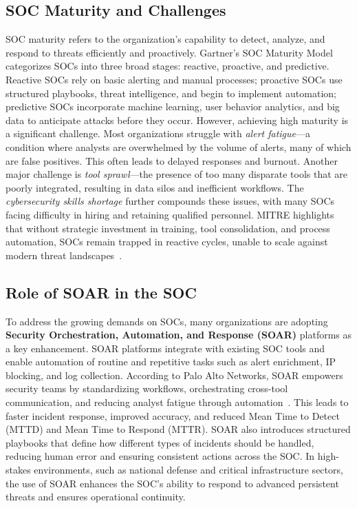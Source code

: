 \subsection{SOC Maturity and Challenges}

SOC maturity refers to the organization's capability to detect, analyze, and respond to threats efficiently and proactively. Gartner’s SOC Maturity Model categorizes SOCs into three broad stages: reactive, proactive, and predictive. Reactive SOCs rely on basic alerting and manual processes; proactive SOCs use structured playbooks, threat intelligence, and begin to implement automation; predictive SOCs incorporate machine learning, user behavior analytics, and big data to anticipate attacks before they occur. However, achieving high maturity is a significant challenge. Most organizations struggle with \textit{alert fatigue}—a condition where analysts are overwhelmed by the volume of alerts, many of which are false positives. This often leads to delayed responses and burnout. Another major challenge is \textit{tool sprawl}—the presence of too many disparate tools that are poorly integrated, resulting in data silos and inefficient workflows. The \textit{cybersecurity skills shortage} further compounds these issues, with many SOCs facing difficulty in hiring and retaining qualified personnel. MITRE highlights that without strategic investment in training, tool consolidation, and process automation, SOCs remain trapped in reactive cycles, unable to scale against modern threat landscapes~\cite{mitre}.

\subsection{Role of SOAR in the SOC}

To address the growing demands on SOCs, many organizations are adopting \textbf{Security Orchestration, Automation, and Response (SOAR)} platforms as a key enhancement. SOAR platforms integrate with existing SOC tools and enable automation of routine and repetitive tasks such as alert enrichment, IP blocking, and log collection. According to Palo Alto Networks, SOAR empowers security teams by standardizing workflows, orchestrating cross-tool communication, and reducing analyst fatigue through automation~\cite{paloalto}. This leads to faster incident response, improved accuracy, and reduced Mean Time to Detect (MTTD) and Mean Time to Respond (MTTR). SOAR also introduces structured playbooks that define how different types of incidents should be handled, reducing human error and ensuring consistent actions across the SOC. In high-stakes environments, such as national defense and critical infrastructure sectors, the use of SOAR enhances the SOC’s ability to respond to advanced persistent threats and ensures operational continuity.
